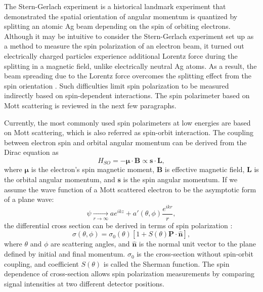 	
	The Stern-Gerlach experiment is a historical landmark experiment that demonstrated the spatial orientation of angular momentum is quantized by splitting an atomic Ag beam depending on the spin of orbiting electrons. Although it may be intuitive to consider the Stern-Gerlach experiment set up as a method to measure the spin polarization of an electron beam, it turned out electrically charged particles experience additional Lorentz force during the splitting in a magnetic field, unlike electrically neutral Ag atoms. As a result, the beam spreading due to the Lorentz force overcomes the splitting effect from the spin orientation \cite{Jozwiak_thesis}. Such difficulties limit spin polarization to be measured indirectly based on spin-dependent interactions.
	The spin polarimeter based on Mott scattering is reviewed in the next few paragraphs.
	
	
	Currently, the most commonly used spin polarimeters at low energies are based on Mott scattering, which is also referred as spin-orbit interaction. The coupling between electron spin and orbital angular momentum can be derived from the Dirac equation as \cite{Kessler}
	\begin{equation}
		H_{SO} = -\boldsymbol{\mu} \cdot \mathbf{B} \propto \mathbf{s \cdot L},
		\label{eq_so}
	\end{equation}
	where $\boldsymbol{\mu}$ is the electron's spin magnetic moment, $\mathbf{B}$ is effective magnetic field, $\mathbf{L}$ is the orbital angular momentum, and $\mathbf{s}$ is the spin angular momentum. If we assume the wave function of a Mott scattered electron to be the asymptotic form of a plane wave:
	\begin{equation}
		\psi \xrightarrow[r \to \infty]{} ae^{ikz} + a'(\theta,\phi)\frac{e^{ikr}}{r},
	\end{equation}
	the differential cross section can be derived in terms of spin polarization \cite{Kessler}:
	\begin{equation}
	\sigma(\theta,\phi) = \sigma_0(\theta)[1 + S(\theta)\mathbf{P \cdot \hat{n}}],
	\label{eq_cross}
	\end{equation}
	where $\theta$ and $\phi$ are scattering angles, and $\mathbf{\hat{n}}$ is the normal unit vector to the plane defined by initial and final momentum. $\sigma_0$ is the cross-section without spin-orbit coupling, and coefficient $S(\theta)$ is called the Sherman function. The spin dependence of cross-section allows spin polarization measurements by comparing signal intensities at two different detector positions. 
	
